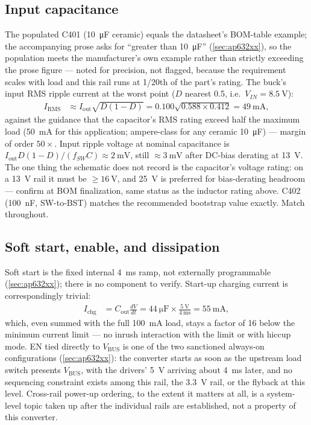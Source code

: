 \subsection{Input capacitance}\label{sec:5v-cin}

The populated C401 (\SI{10}{\micro\farad} ceramic) equals the datasheet's BOM-table
example; the accompanying prose asks for ``greater than \SI{10}{\micro\farad}''
(\cref{sec:ap632xx}), so the population meets the manufacturer's own example rather than
strictly exceeding the prose figure --- noted for precision, not flagged, because the
requirement scales with load and this rail runs at 1/20th of the part's rating. The
buck's input RMS ripple current at the worst point ($D$ nearest 0.5, i.e.\
$V_{IN}=\SI{8.5}{\volt}$):
\begin{align*}
  I_{\mathrm{RMS}} &\approx I_{\mathrm{out}}\sqrt{D(1-D)}
    = 0.100\sqrt{0.588 \times 0.412} = \SI{49}{\milli\ampere},
\end{align*}
against the guidance that the capacitor's RMS rating exceed half the maximum load
(\SI{50}{\milli\ampere} for this application; ampere-class for any ceramic
\SI{10}{\micro\farad}) --- margin of order $50\times$. Input ripple voltage at nominal
capacitance is $I_{\mathrm{out}} D(1-D)/(f_{SW} C) \approx \SI{2}{\milli\volt}$, still
$\approx\SI{3}{\milli\volt}$ after DC-bias derating at 13~V. The one thing the schematic
does not record is the capacitor's voltage rating: on a 13~V rail it must be
$\geq\SI{16}{\volt}$, and \SI{25}{\volt} is preferred for bias-derating headroom ---
confirm at BOM finalization, same status as the inductor rating above. C402
(\SI{100}{\nano\farad}, SW-to-BST) matches the recommended bootstrap value exactly.
Match throughout.

\subsection{Soft start, enable, and dissipation}\label{sec:5v-ss}

Soft start is the fixed internal \SI{4}{\milli\second} ramp, not externally programmable
(\cref{sec:ap632xx}); there is no component to verify. Start-up charging current is
correspondingly trivial:
\begin{align*}
  I_{\mathrm{chg}} &= C_{\mathrm{out}}\frac{dV}{dt}
    = \SI{44}{\micro\farad} \times \frac{\SI{5}{\volt}}{\SI{4}{\milli\second}}
    = \SI{55}{\milli\ampere},
\end{align*}
which, even summed with the full \SI{100}{\milli\ampere} load, stays a factor of 16 below
the minimum current limit --- no inrush interaction with the limit or with hiccup mode.
EN tied directly to $V_{\mathrm{BUS}}$ is one of the two sanctioned always-on
configurations (\cref{sec:ap632xx}): the converter starts as soon as the upstream load
switch presents $V_{\mathrm{BUS}}$, with the drivers' 5~V arriving about
\SI{4}{\milli\second} later, and no sequencing constraint exists among this rail, the
3.3~V rail, or the flyback at this level. Cross-rail power-up ordering, to the extent it
matters at all, is a system-level topic taken up after the individual rails are
established, not a property of this converter.

